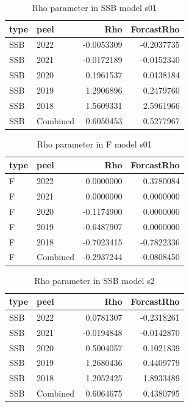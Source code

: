 \documentclass[
]{article}
\begin{document}
\begin{table}[H]
\centering
\caption{\label{tab:unnamed-chunk-16}Rho parameter in SSB model s01}
\centering
\begin{tabular}[t]{llrr}
\toprule
type & peel & Rho & ForcastRho\\
\midrule
SSB & 2022 & -0.0053309 & -0.2037735\\
SSB & 2021 & -0.0172189 & -0.0152340\\
SSB & 2020 & 0.1961537 & 0.0138184\\
SSB & 2019 & 1.2906896 & 0.2479760\\
SSB & 2018 & 1.5609331 & 2.5961966\\
\addlinespace
SSB & Combined & 0.6050453 & 0.5277967\\
\bottomrule
\end{tabular}
\end{table}

\begin{table}[H]
\centering
\caption{\label{tab:unnamed-chunk-16}Rho parameter in F model s01}
\centering
\begin{tabular}[t]{llrr}
\toprule
type & peel & Rho & ForcastRho\\
\midrule
F & 2022 & 0.0000000 & 0.3780084\\
F & 2021 & 0.0000000 & 0.0000000\\
F & 2020 & -0.1174900 & 0.0000000\\
F & 2019 & -0.6487907 & 0.0000000\\
F & 2018 & -0.7023415 & -0.7822336\\
\addlinespace
F & Combined & -0.2937244 & -0.0808450\\
\bottomrule
\end{tabular}
\end{table}

\begin{table}[H]
\centering
\caption{\label{tab:unnamed-chunk-16}Rho parameter in SSB model s2}
\centering
\begin{tabular}[t]{llrr}
\toprule
type & peel & Rho & ForcastRho\\
\midrule
SSB & 2022 & 0.0781307 & -0.2318261\\
SSB & 2021 & -0.0194848 & -0.0142870\\
SSB & 2020 & 0.5004057 & 0.1021839\\
SSB & 2019 & 1.2680436 & 0.4409779\\
SSB & 2018 & 1.2052425 & 1.8933489\\
\addlinespace
SSB & Combined & 0.6064675 & 0.4380795\\
\bottomrule
\end{tabular}
\end{table}
\end{document}
